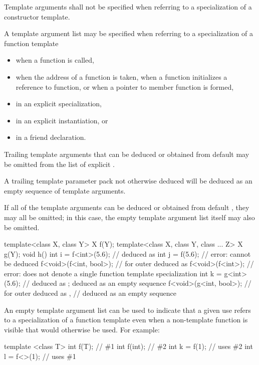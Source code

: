 \pnum
Template arguments shall not be specified
when referring to a specialization of
a constructor template.

\pnum
A template argument list may be specified when referring to a specialization
of a function template
\begin{itemize}
\item
when a function is called,
\item
when the address of a function is taken, when a function initializes a
reference to function, or when a pointer to member function is formed,
\item
in an explicit specialization,
\item
in an explicit instantiation, or
\item
in a friend declaration.
\end{itemize}

\pnum
Trailing template arguments that can be deduced or
obtained from default 
may be omitted from the list of explicit .
\begin{note}
A trailing template parameter pack not otherwise deduced will be
deduced as an empty sequence of template arguments.
\end{note}
If all of the template arguments can be
deduced or obtained from default ,
they may all be omitted;
in this case, the empty template argument list \tcode{<>}
itself may also be omitted.
\begin{example}
\begin{codeblock}
template<class X, class Y> X f(Y);
template<class X, class Y, class ... Z> X g(Y);
void h() {
  int i = f<int>(5.6);          //  deduced as 
  int j = f(5.6);               // error:  cannot be deduced
  f<void>(f<int, bool>);        //  for outer  deduced as 
  f<void>(f<int>);              // error:  does not denote a single function template specialization
  int k = g<int>(5.6);          //  deduced as ;  deduced as an empty sequence
  f<void>(g<int, bool>);        //  for outer  deduced as ,
                                //  deduced as an empty sequence
}
\end{codeblock}
\end{example}

\pnum
\begin{note}
An empty template argument list can be used to indicate that a given
use refers to a specialization of a function template even when a
non-template function is visible that would otherwise be used.
For example:

\begin{codeblock}
template <class T> int f(T);    // \#1
int f(int);                     // \#2
int k = f(1);                   // uses \#2
int l = f<>(1);                 // uses \#1
\end{codeblock}
\end{note}

